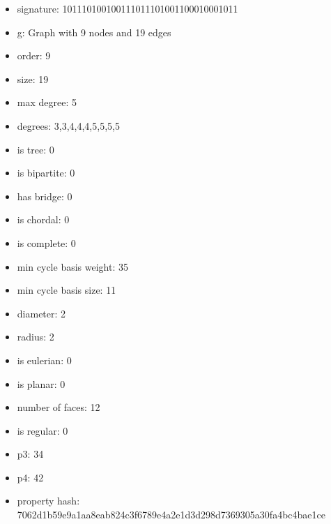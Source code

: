 \newpage
\begin{figure}
\end{figure}
\begin{itemize}
\item signature: 101110100100111011101001100010001011
\item g: Graph with 9 nodes and 19 edges
\item order: 9
\item size: 19
\item max degree: 5
\item degrees: 3,3,4,4,4,5,5,5,5
\item is tree: 0
\item is bipartite: 0
\item has bridge: 0
\item is chordal: 0
\item is complete: 0
\item min cycle basis weight: 35
\item min cycle basis size: 11
\item diameter: 2
\item radius: 2
\item is eulerian: 0
\item is planar: 0
\item number of faces: 12
\item is regular: 0
\item p3: 34
\item p4: 42
\item property hash: 7062d1b59e9a1aa8eab824c3f6789e4a2e1d3d298d7369305a30fa4bc4bae1ce
\end{itemize}
